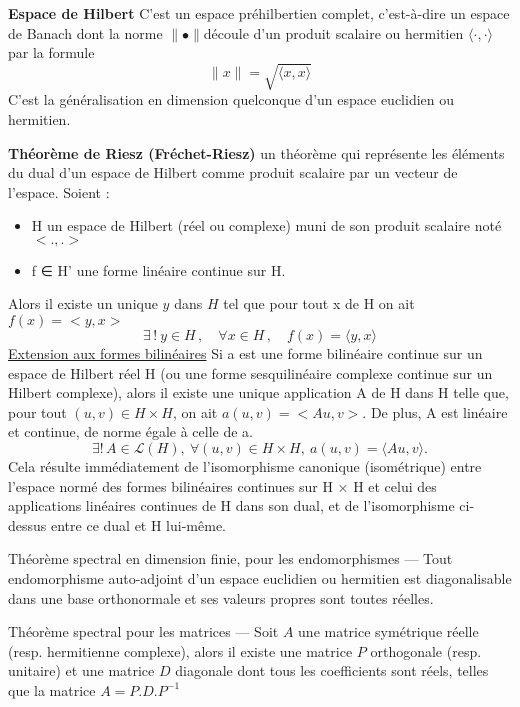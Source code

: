 \textbf{Espace de Hilbert}
C'est un espace pr\'ehilbertien complet, c'est-\`a-dire un espace de Banach dont la norme $\parallel\bullet\parallel$d\'ecoule d'un produit scalaire ou hermitien $\langle\cdot,\cdot\rangle$ par la formule
 $$\parallel x\parallel = \sqrt{\langle x,x \rangle}$$
C'est la g\'en\'eralisation en dimension quelconque d'un espace euclidien ou hermitien.
\bigskip

\textbf{Th\'eor\`eme de Riesz (Fr\'echet-Riesz)}\newline
un th\'eor\`eme qui repr\'esente les \'el\'ements du dual d'un espace de Hilbert comme produit scalaire par un vecteur de l'espace.
Soient :
\begin{itemize}
		\item H un espace de Hilbert (r\'eel ou complexe) muni de son produit scalaire not\'e $<.,.>$
		\item f ∈ H' une forme lin\'eaire continue sur H.
\end{itemize}
Alors il existe un unique $y$ dans $H$ tel que pour tout x de H on ait $f(x) = <y, x>$
$$
\exists\,!\ y \in H\,, \quad \forall x\in H\,, \quad f(x) = \langle y,x\rangle
$$
\underline{Extension aux formes bilin\'eaires}\newline
Si a est une forme bilin\'eaire continue sur un espace de Hilbert r\'eel H (ou une forme sesquilin\'eaire complexe continue sur un Hilbert complexe), alors il existe une unique application A de H dans H telle que, pour tout $(u, v) \in H \times H$, on ait $a(u, v) = <Au, v>$. De plus, A est lin\'eaire et continue, de norme \'egale \`a celle de a.
$$
\exists !\,A\in\mathcal{L}(H),\ \forall (u,v)\in H\times H,\ a(u,v)=\langle Au,v \rangle.
$$
Cela r\'esulte imm\'ediatement de l'isomorphisme canonique (isom\'etrique) entre l'espace norm\'e des formes bilin\'eaires continues sur H × H et celui des applications lin\'eaires continues de H dans son dual, et de l'isomorphisme ci-dessus entre ce dual et H lui-m\^eme.
\bigskip

\begin{theorem}
Th\'eor\`eme spectral en dimension finie, pour les endomorphismes —  Tout endomorphisme auto-adjoint d'un espace euclidien ou hermitien est diagonalisable dans une base orthonormale et ses valeurs propres sont toutes r\'eelles.

Th\'eor\`eme spectral pour les matrices —  Soit $A$ une matrice sym\'etrique r\'eelle (resp. hermitienne complexe), alors il existe une matrice $P$ orthogonale (resp. unitaire) et une matrice $D$ diagonale dont tous les coefficients sont r\'eels, telles que la matrice $A = P.D.P^{-1}$
\end{theorem}

